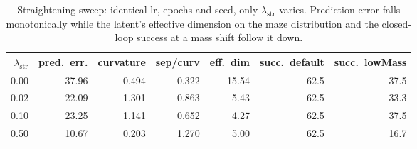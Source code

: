 \begin{table}[t]\centering
\caption{Straightening sweep: identical lr, epochs and seed, only $\lambda_{\mathrm{str}}$ varies. Prediction error falls monotonically while the latent's effective dimension on the maze distribution and the closed-loop success at a mass shift follow it down.}
\label{tab:geom}\small
\begin{tabular}{rrrrrrr}
\toprule
$\lambda_{\mathrm{str}}$ & pred.\ err. & curvature & sep/curv & eff.\ dim & succ.\ default & succ.\ lowMass \\
\midrule
0.00 & 37.96 & 0.494 & 0.322 & 15.54 & 62.5 & 37.5 \\
0.02 & 22.09 & 1.301 & 0.863 & 5.43 & 62.5 & 33.3 \\
0.10 & 23.25 & 1.141 & 0.652 & 4.27 & 62.5 & 37.5 \\
0.50 & 10.67 & 0.203 & 1.270 & 5.00 & 62.5 & 16.7 \\
\bottomrule
\end{tabular}\end{table}